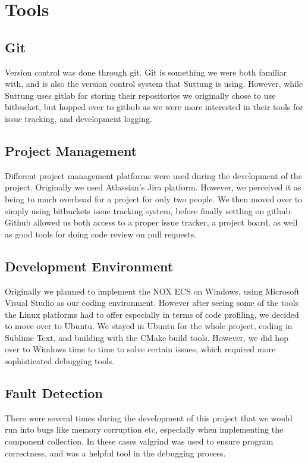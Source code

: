 \section{Tools}
\subsection{Git}
Version control was done through git. Git is something we were both familiar with, and is also the version control
system that Suttung is using. However, while Suttung uses gitlab for storing their repositories we originally
chose to use bitbucket, but hopped over to github as we were more interested in their tools for issue tracking,
and development logging.

\subsection{Project Management}
Different project management platforms were used during the development of the project.
Originally we used Atlassian's Jira platform. However, we perceived it as being to much overhead for a project
for only two people. We then moved over to simply using bitbuckets issue tracking system, before finally
settling on github. Github allowed us both access to a proper issue tracker, a project board, as well as good tools
for doing code review on pull requests.

\subsection{Development Environment}
Originally we planned to implement the NOX ECS on Windows, using Microsoft Visual Studio as our coding environment.
However after seeing some of the tools the Linux platforms had to offer especially in terms of code profiling,
we decided to move over to Ubuntu.
We stayed in Ubuntu for the whole project, coding in Sublime Text, and building with the CMake build tools.
However, we did hop over to Windows time to time to solve certain issues, which required more sophisticated debugging tools.

\subsection{Fault Detection}
There were several times during the development of this project that we would run into bugs like memory corruption etc,
especially when implementing the component collection.
In these cases valgrind was used to ensure program correctness, and was a helpful tool in the debugging process.
